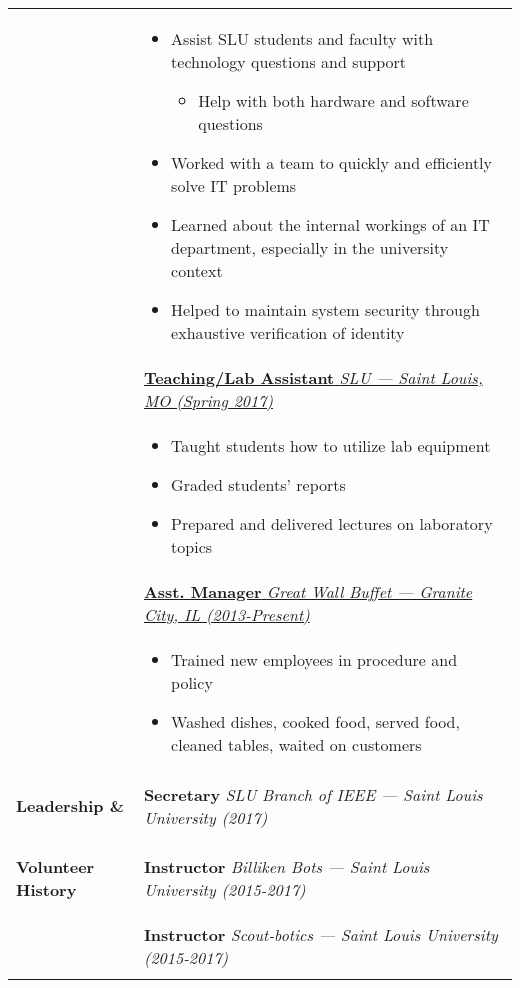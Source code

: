 \documentclass[11pt]{article}
\begin{document}
\begin{tabularx}{\textwidth}{|l|X|}
		& \vspace{-0.7\topsep}
		\begin{itemize}[noitemsep, nolistsep]
			\item Assist SLU students and faculty with technology questions and support
			\begin{itemize}[noitemsep, nolistsep]
				\item Help with both hardware and software questions
			\end{itemize}
			\item Worked with a team to quickly and efficiently solve IT problems
			\item Learned about the internal workings of an IT department, especially in the university context
			\item Helped to maintain system security through exhaustive verification of identity
		\end{itemize} \\
		& \uline{\textbf{Teaching/Lab Assistant} \hfill \footnotesize{\textit{SLU --- Saint Louis, MO (Spring 2017)}}} \\
		& \vspace{-0.7\topsep}
		\begin{itemize}[noitemsep, nolistsep]
			\item Taught students how to utilize lab equipment
			\item Graded students' reports
			\item Prepared and delivered lectures on laboratory topics
		\end{itemize}\\
		& \uline{\textbf{Asst. Manager} \hfill \footnotesize{\textit{Great Wall Buffet --- Granite City, IL (2013-Present)}}} \\
		& \vspace{-0.7\topsep}
		\begin{itemize}[noitemsep, nolistsep]
			\item Trained new employees in procedure and policy
			\item Washed dishes, cooked food, served food, cleaned tables, waited on customers
		\end{itemize}\\
		\begin{large}\textbf{Leadership \& }\end{large}
		& \textbf{Secretary} \hfill \footnotesize{\textit{SLU Branch of IEEE --- Saint Louis University (2017)}} \\
		\begin{large}\textbf{Volunteer History}\end{large} 
		& \textbf{Instructor} \hfill \footnotesize{\textit{Billiken Bots --- Saint Louis University (2015-2017)}}\\
		& \textbf{Instructor} \hfill \footnotesize{\textit{Scout-botics --- Saint Louis University (2015-2017)}} \\ & \\ \hline
	\end{tabularx}
\end{document}
